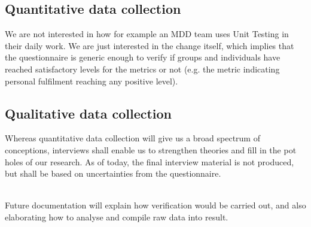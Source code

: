 \documentclass[ProjectPlan_innit.tex]{subfiles}
\begin{document}
\subsection{Quantitative data collection}
We are not interested in how for example an MDD team uses Unit Testing in their daily work. We are just interested in the change itself, which implies that the questionnaire is generic enough to verify if groups and individuals have reached satisfactory levels for the metrics or not (e.g. the metric indicating personal fulfilment reaching any positive level). 

\subsection{Qualitative data collection}
Whereas quantitative data collection will give us a broad spectrum of conceptions, interviews shall enable us to strengthen theories and fill in the pot holes of our research. As of today, the final interview material is not produced, but shall be based on uncertainties from the questionnaire.

\hspace{0pt}\\ Future documentation will explain how verification would be carried out, and also elaborating how to analyse and compile raw data into result.
\end{document}
